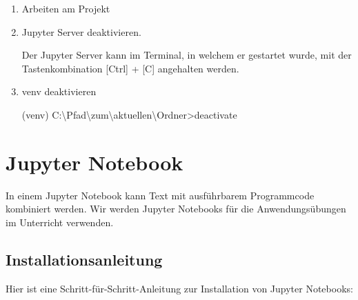 \documentclass[
  nswissgerman,
  a4paper,
  DIV=11,
  numbers=noendperiod,
  ngerman]{scrreprt}
\newenvironment{Shaded}{\begin{snugshade}}{\end{snugshade}}
\newcommand{\NormalTok}[1]{\textcolor[rgb]{0.00,0.23,0.31}{#1}}
\begin{document}
\begin{enumerate}
\begin{Shaded}
\begin{Highlighting}[numbers=left,,]
\NormalTok{(venv) C:\textbackslash{}Pfad\textbackslash{}zum\textbackslash{}aktuellen\textbackslash{}Ordner\textgreater{}jupyter notebook}
\end{Highlighting}
\end{Shaded}

  Das Terminal, in welchem der Jupyter Server gestartet wurde, darf
  \textbf{nicht} geschlossen werden.
\item
  Arbeiten am Projekt
\item
  Jupyter Server deaktivieren.

  Der Jupyter Server kann im Terminal, in welchem er gestartet wurde,
  mit der Tastenkombination {[}Ctrl{]} + {[}C{]} angehalten werden.
\item
  venv deaktivieren

\begin{Shaded}
\begin{Highlighting}[numbers=left,,]
\NormalTok{(venv) C:\textbackslash{}Pfad\textbackslash{}zum\textbackslash{}aktuellen\textbackslash{}Ordner\textgreater{}deactivate}
\end{Highlighting}
\end{Shaded}
\end{enumerate}

\chapter{Jupyter Notebook}\label{jupyter-notebook}

In einem Jupyter Notebook kann Text mit ausführbarem Programmcode
kombiniert werden. Wir werden Jupyter Notebooks für die
Anwendungsübungen im Unterricht verwenden.

\section{Installationsanleitung}\label{installationsanleitung}

Hier ist eine Schritt-für-Schritt-Anleitung zur Installation von Jupyter
Notebooks:
\end{document}
